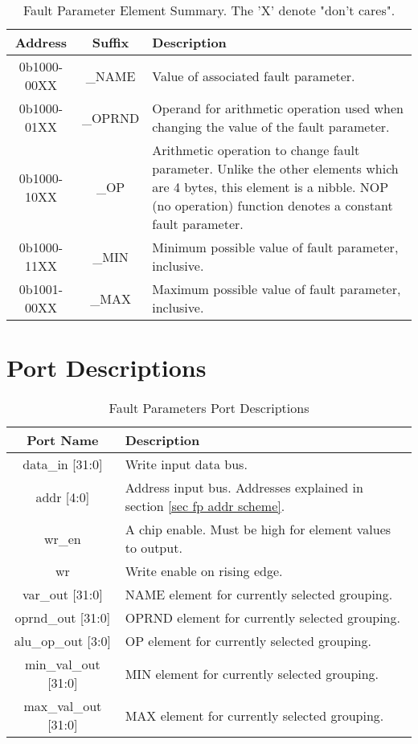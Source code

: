 \documentclass[]{report}
\begin{document}
\begin{table}[h]
	\centering
	\caption{Fault Parameter Element Summary. The 'X' denote "don't cares".}
	\begin{tabular}{|c|c|p{9cm}|}
		\hline 
		Address & Suffix & Description \\ 
		\hline
		0b1000-00XX & \_NAME & Value of associated fault parameter.\\
		\hline
		0b1000-01XX & \_OPRND & Operand for arithmetic operation used when changing the value of the fault parameter. \\ 
		\hline 
		0b1000-10XX & \_OP & Arithmetic operation to change fault parameter. Unlike the other elements which are 4 bytes, this element is a nibble. NOP (no operation) function denotes a constant fault parameter. \\ 
		\hline 
		0b1000-11XX & \_MIN & Minimum possible value of fault parameter, inclusive. \\ 
		\hline 
		0b1001-00XX & \_MAX & Maximum possible value of fault parameter, inclusive. \\ 
		\hline 
	\end{tabular} 
	\label{table:element summary}
\end{table}
\clearpage
\section{Port Descriptions}
\label{s fp port summ}


\begin{table}[th]
	\centering
	\caption{Fault Parameters Port Descriptions}
	\label{table:fp port desc}
	\begin{tabular}{|c|p{}|}
		\hline 
		Port Name & Description \\ 
		\hline 
		data\_in [31:0] & Write input data bus.\\  
		\hline
		addr [4:0]& Address input bus. Addresses explained in section \ref{sec fp addr scheme}.\\
		\hline
		wr\_en & A chip enable. Must be high for element values to output.\\
		\hline
		wr & Write enable on rising edge.\\
		\hline
		var\_out [31:0] & NAME element for currently selected grouping.\\
		\hline
		oprnd\_out [31:0] & OPRND element for currently selected grouping.\\
		\hline
		alu\_op\_out [3:0] & OP element for currently selected grouping.\\
		\hline
		min\_val\_out [31:0] & MIN element for currently selected grouping.\\
		\hline
		max\_val\_out [31:0] & MAX element for currently selected grouping.\\
		\hline
	\end{tabular}
\end{table}
\end{document}
